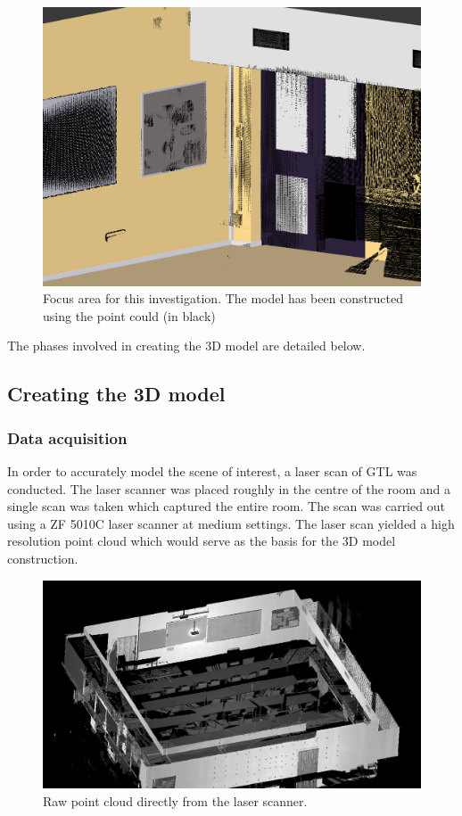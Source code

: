 \documentclass[11pt,a4paper]{report}
\begin{document}
		\begin{figure}[H]
			\centering
			\includegraphics[width=1\textwidth]{model_with_increased_detail}
			\caption[3D model]{Focus area for this investigation. The model has been constructed using the point could (in black)}
			\label{fig:gtl}
		\end{figure}
		
		The phases involved in creating the 3D model are detailed below.
		
		\subsection{Creating the 3D model}
			\subsubsection{Data acquisition}
				In order to accurately model the scene of interest, a laser scan of GTL was conducted. The laser scanner was placed roughly in the centre of the room and a single scan was taken which captured the entire room. The scan was carried out using a ZF 5010C laser scanner at medium settings. The laser scan yielded a high resolution point cloud which would serve as the basis for the 3D model construction.
				
				\begin{figure}[H]
					\centering
					\includegraphics[width=1\textwidth]{raw_point_cloud_1}
					\caption[Raw point cloud]{Raw point cloud directly from the laser scanner.}
				\end{figure}
				
\end{document}
